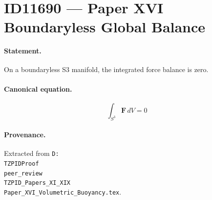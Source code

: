 \section*{ID11690 --- Paper XVI Boundaryless Global Balance}

\paragraph{Statement.}
On a boundaryless S3 manifold, the integrated force balance is zero.

\paragraph{Canonical equation.}
\[
\int_{S^3}\mathbf{F}\,dV=0
\]

\paragraph{Provenance.}
Extracted from \texttt{D:\\TZPIDProof\\peer\_review\\TZPID\_Papers\_XI\_XIX\\Paper\_XVI\_Volumetric\_Buoyancy.tex}.
